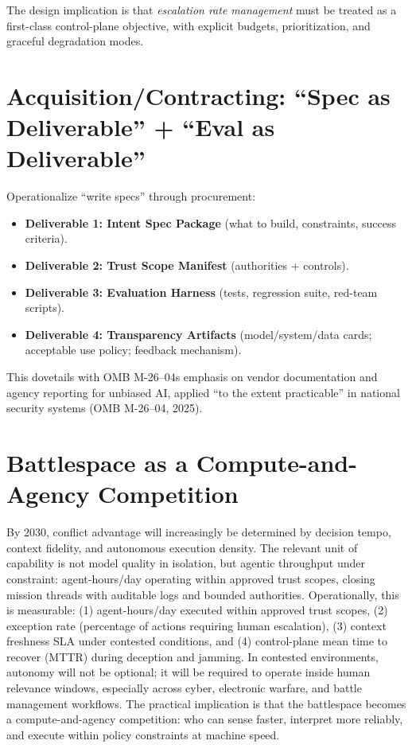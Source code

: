 \documentclass[11pt]{article}
\begin{document}
The design implication is that \emph{escalation rate management} must be treated as a first-class control-plane objective, with explicit budgets, prioritization, and graceful degradation modes.


\section{Acquisition/Contracting: ``Spec as Deliverable'' + ``Eval as Deliverable''}\label{acquisitioncontracting-spec-as-deliverable--eval-as-deliverable}

Operationalize ``write specs'' through procurement:

\begin{itemize}
\item
  \textbf{Deliverable 1: Intent Spec Package} (what to build, constraints, success criteria).
\item
  \textbf{Deliverable 2: Trust Scope Manifest} (authorities + controls).
\item
  \textbf{Deliverable 3: Evaluation Harness} (tests, regression suite, red-team scripts).
\item
  \textbf{Deliverable 4: Transparency Artifacts} (model/system/data cards; acceptable use policy; feedback mechanism).
\end{itemize}

This dovetails with OMB M-26--04\textquotesingle s emphasis on vendor documentation and agency reporting for unbiased AI, applied ``to the extent practicable'' in national security systems (OMB M-26--04, 2025).

\section{Battlespace as a Compute-and-Agency Competition}\label{battlespace-as-a-compute-and-agency-competition}

By 2030, conflict advantage will increasingly be determined by decision tempo, context fidelity, and autonomous execution density. The relevant unit of capability is not model quality in isolation, but agentic throughput under constraint: agent-hours/day operating within approved trust scopes, closing mission threads with auditable logs and bounded authorities. Operationally, this is measurable: (1) agent-hours/day executed within approved trust scopes, (2) exception rate (percentage of actions requiring human escalation), (3) context freshness SLA under contested conditions, and (4) control-plane mean time to recover (MTTR) during deception and jamming. In contested environments, autonomy will not be optional; it will be required to operate inside human relevance windows, especially across cyber, electronic warfare, and battle management workflows. The practical implication is that the battlespace becomes a compute-and-agency competition: who can sense faster, interpret more reliably, and execute within policy constraints at machine speed.
\end{document}
